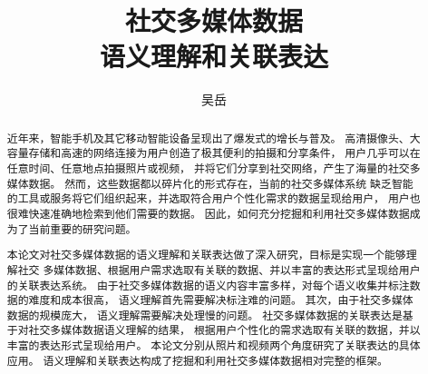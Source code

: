 \documentclass[doctor]{ustcthesis}
\title{社交多媒体数据\\语义理解和关联表达}
\author{吴岳}
\begin{document}
\maketitle

%
%
%

\frontmatter

\begin{abstract}
    近年来，智能手机及其它移动智能设备呈现出了爆发式的增长与普及。
    高清摄像头、大容量存储和高速的网络连接为用户创造了极其便利的拍摄和分享条件，
    用户几乎可以在任意时间、任意地点拍摄照片或视频，
    并将它们分享到社交网络，产生了海量的社交多媒体数据。
    然而，这些数据都以碎片化的形式存在，当前的社交多媒体系统
    缺乏智能的工具或服务将它们组织起来，并选取符合用户个性化需求的数据呈现给用户，
    用户也很难快速准确地检索到他们需要的数据。
    因此，如何充分挖掘和利用社交多媒体数据成为了当前重要的研究问题。

    本论文对社交多媒体数据的语义理解和关联表达做了深入研究，目标是实现一个能够理解社交
    多媒体数据、根据用户需求选取有关联的数据、并以丰富的表达形式呈现给用户的关联表达系统。
    由于社交多媒体数据的语义内容丰富多样，对每个语义收集并标注数据的难度和成本很高，
    语义理解首先需要解决标注难的问题。 其次，由于社交多媒体数据的规模庞大，
    语义理解需要解决处理慢的问题。
    社交多媒体数据的关联表达是基于对社交多媒体数据语义理解的结果，
    根据用户个性化的需求选取有关联的数据，并以丰富的表达形式呈现给用户。
    本论文分别从照片和视频两个角度研究了关联表达的具体应用。
    语义理解和关联表达构成了挖掘和利用社交多媒体数据相对完整的框架。


\end{abstract}
\end{document}
